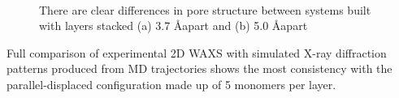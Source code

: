 \documentclass{article}
\newcommand{\angstrom}{\textup{\AA}}
\begin{document}
\begin{figure}
\begin{subfigure}{.45\textwidth}
		\centering
		\caption{~\label{fig:phaseB}}
	\end{subfigure}
	\caption{There are clear differences in pore structure between systems built with layers stacked (a) 3.7 \angstrom apart and (b) 5.0 \angstrom apart}
	\label{fig:porestructures}
	\end{figure}

	Full comparison of experimental 2D WAXS with simulated X-ray diffraction patterns produced from MD trajectories shows the most consistency with the parallel-displaced configuration made up of 5 monomers per layer.
\end{document}
